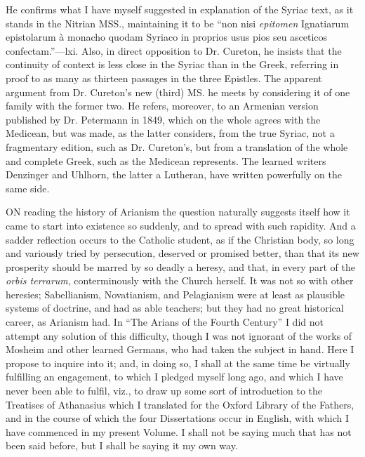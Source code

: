 He confirms what I have myself
suggested in explanation of the Syriac text, as it stands in the
Nitrian MSS., maintaining it to be ``non nisi \emph{epitomen}
Ignatiarum epistolarum à monacho quodam Syriaco in proprios usus pios
seu asceticos confectam.''—lxi. Also, in direct opposition to Dr.
Cureton, he insists that the continuity of context is less close in
the Syriac than in the Greek, referring in proof to as many as
thirteen passages in the three Epistles. The apparent argument from
Dr. Cureton's new (third) MS. he meets by considering it of one family
with the former two. He refers, moreover, to an Armenian version
published by Dr. Petermann in 1849, which on the whole agrees with the
Medicean, but was made, as the latter considers, from the true Syriac,
not a fragmentary edition, such as Dr. Cureton's, but from a
translation of the whole and complete Greek, such as the Medicean
represents. The learned writers Denzinger and Uhlhorn, the latter a
Lutheran, have written powerfully on the same side.


ON reading the history of Arianism the
question naturally suggests itself how it came to start into existence
so suddenly, and to spread with such rapidity. And a sadder reflection
occurs to the Catholic student, as if the Christian body, so long and
variously tried by persecution, deserved or promised better, than that
its new prosperity should be marred by so deadly a heresy, and that,
in every part of the \emph{orbis terrarum}, conterminously with the
Church herself. It was not so with other heresies; Sabellianism,
Novatianism, and Pelagianism were at least as plausible systems of
doctrine, and had as able teachers; but they had no great historical
career, as Arianism had. In ``The Arians of the Fourth
Century'' I did not attempt any solution of this difficulty,
though I was not ignorant of the works of Mosheim and other
learned Germans, who had taken the subject in hand. Here I propose to
inquire into it; and, in doing so, I shall at the same time be
virtually fulfilling an engagement, to which I pledged myself long
ago, and which I have never been able to fulfil, viz., to draw up some
sort of introduction to the Treatises of Athanasius which I translated
for the Oxford Library of the Fathers, and in the course of which the
four Dissertations occur in English, with which I have commenced in my
present Volume. I shall not be saying much that has not been said
before, but I shall be saying it my own way.

